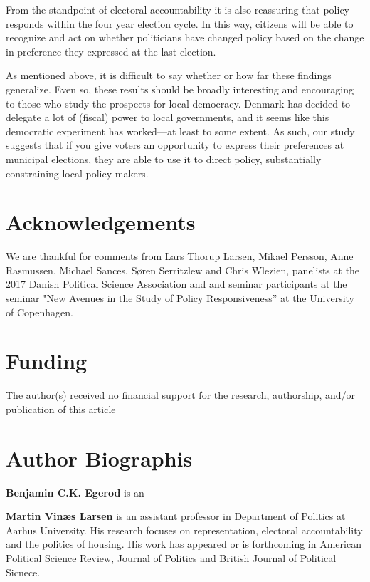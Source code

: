 \documentclass[a4paper,12pt]{article}
\begin{document}
From the standpoint of electoral accountability it is also reassuring that policy responds within the four year election cycle. In this way, citizens will be able to recognize and act on whether politicians have changed policy based on the change in preference they expressed at the last election.  

As mentioned above, it is difficult to say whether or how far these findings generalize. Even so, these results should be broadly interesting and encouraging to those who study the prospects for local democracy.  Denmark has decided to delegate a lot of (fiscal) power to local governments, and it seems like this democratic experiment has worked---at least to some extent. As such, our study suggests that if you give voters an opportunity to express their preferences at municipal elections, they are able to use it to direct policy, substantially constraining local policy-makers.


\section*{Acknowledgements}
We are thankful for comments from Lars Thorup Larsen, Mikael Persson, Anne Rasmussen, Michael Sances, Søren Serritzlew and Chris Wlezien, panelists at the 2017 Danish Political Science Association and and seminar participants at the seminar "New Avenues in the Study of Policy Responsiveness” at the University of Copenhagen.


\section*{Funding}
The author(s) received no financial support for the research, authorship, and/or publication of this article

\theendnotes

\onehalfspacing



\clearpage

\renewcommand{\thesubsection}{\Alph{subsection}}
\renewcommand{\thetable}{\Alph{subsection}\arabic{table}}
\renewcommand{\thefigure}{\Alph{subsection}\arabic{figure}}


\section*{Author Biographis}

\noindent \textbf{Benjamin C.K. Egerod} is an 

\noindent \textbf{Martin Vinæs Larsen} is an assistant professor in Department of Politics at Aarhus University. His research focuses on representation,  electoral accountability and the politics of housing. His work has appeared or is forthcoming in American Political Science Review, Journal of Politics and British Journal of Political Sicnece.
\end{document}
